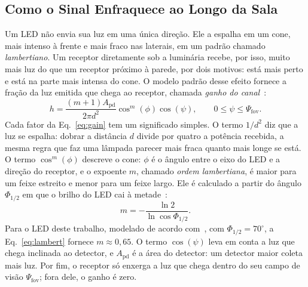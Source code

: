 \subsection{Como o Sinal Enfraquece ao Longo da Sala}\label{sec:fund-channel}
Um LED não envia sua luz em uma única direção. Ele a espalha em um cone, mais
intenso à frente e mais fraco nas laterais, em um padrão chamado
\emph{lambertiano}. Um receptor diretamente sob a luminária recebe, por isso,
muito mais luz do que um receptor próximo à parede, por dois motivos: está mais
perto e está na parte mais intensa do cone. O modelo padrão desse efeito
fornece a fração da luz emitida que chega ao receptor, chamada \emph{ganho do
canal}~\cite{kahn1997wireless,komine2004vlc}:
\begin{equation}
h = \frac{(m+1)A_{\mathrm{pd}}}{2\pi d^{2}}\cos^{m}(\phi)\cos(\psi),
\qquad 0\le\psi\le\Psi_{\mathrm{fov}}.
\label{eq:gain}
\end{equation}
Cada fator da Eq.~\eqref{eq:gain} tem um significado simples. O termo
$1/d^{2}$ diz que a luz se espalha: dobrar a distância $d$ divide por quatro a
potência recebida, a mesma regra que faz uma lâmpada parecer mais fraca quanto
mais longe se está. O termo $\cos^{m}(\phi)$ descreve o cone: $\phi$ é o ângulo
entre o eixo do LED e a direção do receptor, e o expoente $m$, chamado
\emph{ordem lambertiana}, é maior para um feixe estreito e menor para um feixe
largo. Ele é calculado a partir do ângulo $\Phi_{1/2}$ em que o brilho do LED
cai à metade~\cite{kahn1997wireless}:
\begin{equation}
m = -\frac{\ln 2}{\ln\cos\Phi_{1/2}}.
\label{eq:lambert}
\end{equation}
Para o LED deste trabalho, modelado de acordo com~\cite{almoliki2022lci}, com $\Phi_{1/2}=70^{\circ}$, a
Eq.~\eqref{eq:lambert} fornece $m\approx0{,}65$. O termo $\cos(\psi)$ leva em
conta a luz que chega inclinada ao detector, e $A_{\mathrm{pd}}$ é a área do
detector: um detector maior coleta mais luz. Por fim, o receptor só enxerga a
luz que chega dentro do seu campo de visão $\Psi_{\mathrm{fov}}$; fora dele, o
ganho é zero.

